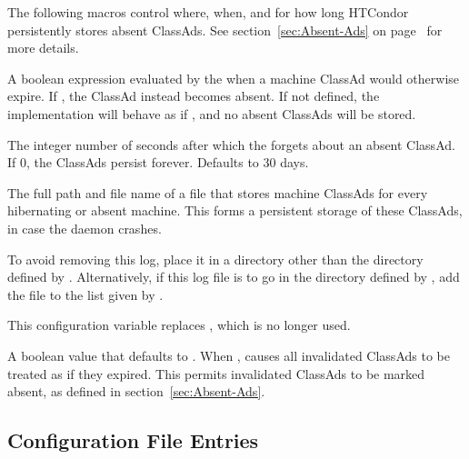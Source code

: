 The following macros control where, when, and for how long HTCondor 
persistently stores absent ClassAds.
See section~\ref{sec:Absent-Ads} on 
page~\pageref{sec:Absent-Ads} for more details.

\begin{description}

\label{param:AbsentRequirements}
\item[\Macro{ABSENT\_REQUIREMENTS}]
  A boolean expression evaluated by the  when a 
  machine ClassAd would otherwise expire.
  If , the ClassAd instead becomes absent.
  If not defined, the implementation will behave as if ,
  and no absent ClassAds will be stored.

\label{param:AbsentExpireAdsAfter}
\item[\Macro{ABSENT\_EXPIRE\_ADS\_AFTER}]
  The integer number of seconds after which the  
  forgets about an absent ClassAd.
  If 0, the ClassAds persist forever.  
  Defaults to 30 days.

\label{param:CollectorPersisentAdLog}
\item[\Macro{COLLECTOR\_PERSISTENT\_AD\_LOG}]
  The full path and file name of a file that stores machine ClassAds 
  for every hibernating or absent machine.  This forms a persistent storage
  of these ClassAds, in case the  daemon crashes.

  To avoid  removing this log, place it in a directory
  other than the directory defined by .  
  Alternatively, if this log file is to go in the 
  directory defined by , add the file to the list
  given by .

  This configuration variable replaces ,
  which is no longer used.

\label{param:ExpireInvalidatedAds}
\item[\Macro{EXPIRE\_INVALIDATED\_ADS}]
  A boolean value that defaults to .
  When , causes all invalidated ClassAds to be treated 
  as if they expired.
  This permits invalidated ClassAds to be marked absent,
  as defined in section~\ref{sec:Absent-Ads}.
\end{description}

\subsection{\label{sec:Negotiator-Config-File-Entries}
Configuration File Entries}

